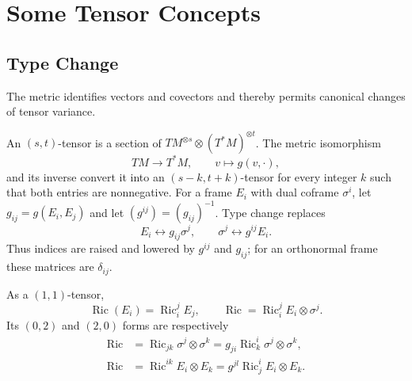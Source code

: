 \section{Some Tensor Concepts}

\subsection{Type Change}

The metric identifies vectors and covectors and thereby permits canonical
changes of tensor variance.

\begin{definition}
  \label{def:pet-ch1-tensor-type-change}
  \leanok
  An $(s,t)$-tensor is a section of
  $TM^{\otimes s}\otimes(T^*M)^{\otimes t}$. The metric isomorphism
  \[
    TM\longrightarrow T^*M,
    \qquad v\longmapsto g(v,\cdot),
  \]
  and its inverse convert it into an $(s-k,t+k)$-tensor for every integer $k$
  such that both entries are nonnegative. For a frame $E_i$ with dual coframe
  $\sigma^i$, let
  $g_{ij}=g(E_i,E_j)$ and let $(g^{ij})=(g_{ij})^{-1}$. Type change replaces
  \[
    E_i\longleftrightarrow g_{ij}\sigma^j,
    \qquad
    \sigma^j\longleftrightarrow g^{ij}E_i.
  \]
  Thus indices are raised and lowered by $g^{ij}$ and $g_{ij}$; for an
  orthonormal frame these matrices are $\delta_{ij}$.
\end{definition}

\begin{notation}
  \label{def:pet-ch1-ricci-types}
  \leanok
  As a $(1,1)$-tensor,
  \[
    \operatorname{Ric}(E_i)=\operatorname{Ric}^j_iE_j,
    \qquad
    \operatorname{Ric}=\operatorname{Ric}^j_iE_i\otimes\sigma^j.
  \]
  Its $(0,2)$ and $(2,0)$ forms are respectively
  \[
  \begin{aligned}
    \operatorname{Ric}
      &=\operatorname{Ric}_{jk}\sigma^j\otimes\sigma^k
        =g_{ji}\operatorname{Ric}^i_k\sigma^j\otimes\sigma^k,\\
    \operatorname{Ric}
      &=\operatorname{Ric}^{ik}E_i\otimes E_k
        =g^{jl}\operatorname{Ric}^i_jE_i\otimes E_k.
  \end{aligned}
  \]
\end{notation}

